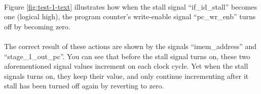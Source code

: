 \paragraph*{}
Figure \ref{fig:test-1-text} illustrates how when the stall signal
``if\_id\_stall'' becomes one (logical high), the program counter's write-enable
signal ``pc\_wr\_enb'' turns off by becoming zero.
\paragraph*{}
The correct result of these actions are shown by the signals ``imem\_address''
and ``stage\_1\_out\_pc''. You can see that before the stall signal turns on,
these two aforementioned signal values increment on each clock cycle. Yet when
the stall signals turns on, they keep their value, and only continue
incrementing after it stall has been turned off again by reverting to zero.
